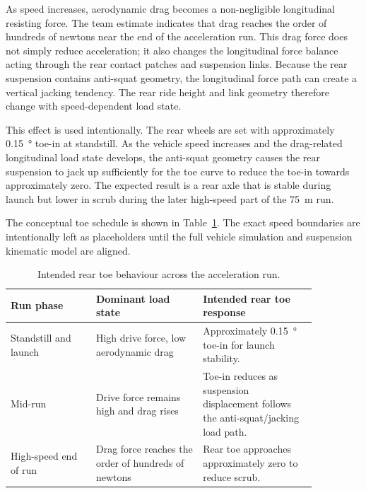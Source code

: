 As speed increases, aerodynamic drag becomes a non-negligible longitudinal resisting force. The team estimate indicates that drag reaches the order of hundreds of newtons near the end of the acceleration run. This drag force does not simply reduce acceleration; it also changes the longitudinal force balance acting through the rear contact patches and suspension links. Because the rear suspension contains anti-squat geometry, the longitudinal force path can create a vertical jacking tendency. The rear ride height and link geometry therefore change with speed-dependent load state.

This effect is used intentionally. The rear wheels are set with approximately \SI{0.15}{\degree} toe-in at standstill. As the vehicle speed increases and the drag-related longitudinal load state develops, the anti-squat geometry causes the rear suspension to jack up sufficiently for the toe curve to reduce the toe-in towards approximately zero. The expected result is a rear axle that is stable during launch but lower in scrub during the later high-speed part of the \SI{75}{m} run.


The conceptual toe schedule is shown in Table~\ref{tab:toe}. The exact speed boundaries are intentionally left as placeholders until the full vehicle simulation and suspension kinematic model are aligned.

\begin{table}[H]
\caption{Intended rear toe behaviour across the acceleration run.}
\label{tab:toe}
\centering
\begin{tabular}{p{0.24\linewidth}p{0.30\linewidth}p{0.32\linewidth}}
\toprule
Run phase & Dominant load state & Intended rear toe response \\
\midrule
Standstill and launch & High drive force, low aerodynamic drag & Approximately \SI{0.15}{\degree} toe-in for launch stability. \\
Mid-run & Drive force remains high and drag rises & Toe-in reduces as suspension displacement follows the anti-squat/jacking load path. \\
High-speed end of run & Drag force reaches the order of hundreds of newtons & Rear toe approaches approximately zero to reduce scrub. \\
\bottomrule
\end{tabular}
\end{table}

